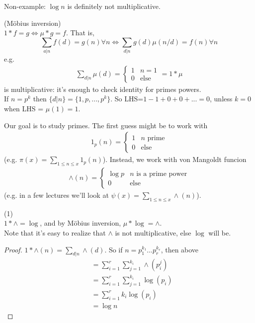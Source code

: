 \documentclass[a4paper]{article}
\begin{document}
Non-example: $\log n$ is definitely not multiplicative.

\begin{fact} (M\"{o}bius inversion)\\
$1*f=g \iff \mu*g=f$. That is,
$$\sum_{a|n} f(d) = g(n) \forall n \iff \sum_{d|n} g(d)\mu(n/d) = f(n) \forall n$$
e.g.
\begin{equation*}
\begin{aligned}
\sum_{d|n}\mu(d) = \left\{\begin{array}{ll}
1 & n=1\\
0 & \text{else}
\end{array}
\right. = 1*\mu
\end{aligned}
\end{equation*}
is multiplicative: it's enough to check identity for primes powers.\\
If $n=p^k$ then $\{d|n\} = \{1,p,...,p^k\}$. So LHS=$1-1+0+0+...=0$, unless $k=0$ when LHS = $\mu(1) = 1$.

Our goal is to study primes. The first guess might be to work with
\begin{equation*}
\begin{aligned}
1_p(n) = \left\{\begin{array}{ll}
1 & n \text{ prime}\\
0 & \text{else}
\end{array}
\right.
\end{aligned}
\end{equation*}
(e.g. $\pi(x) = \sum_{1 \leq n \leq x} 1_p(n)$). Instead, we work with von Mangoldt funcion
\begin{equation*}
\begin{aligned}
\wedge(n) = \left\{\begin{array}{ll}
\log p & n \text{ is a prime power}\\
0 & \text{else}
\end{array}
\right.
\end{aligned}
\end{equation*}
(e.g. in a few lectures we'll look at $\psi(x) = \sum_{1\leq n \leq x} \wedge(n)$).
\end{fact}

\begin{lemma} (1)\\
$1*\wedge = \log$, and by M\"{o}bius inversion, $\mu*\log = \wedge$.\\
Note that it's easy to realize that $\wedge$ is not multiplicative, else $\log$ will be.
\begin{proof}
$1*\wedge(n) = \sum_{d | n} \wedge(d)$. So if $n=p_1^{k_1}...p_r^{k_r}$, then above
\begin{equation*}
\begin{aligned}
&=\sum_{i=1}^r \sum_{j=1}^{k_i} \wedge(p_i^j)\\
&=\sum_{i=1}^r \sum_{j=1}^{k_i} \log(p_i)\\
&= \sum_{i=1}^r k_i \log (p_i)\\
&= \log n
\end{aligned}
\end{equation*}
\end{proof}
\end{lemma}
\end{document}
